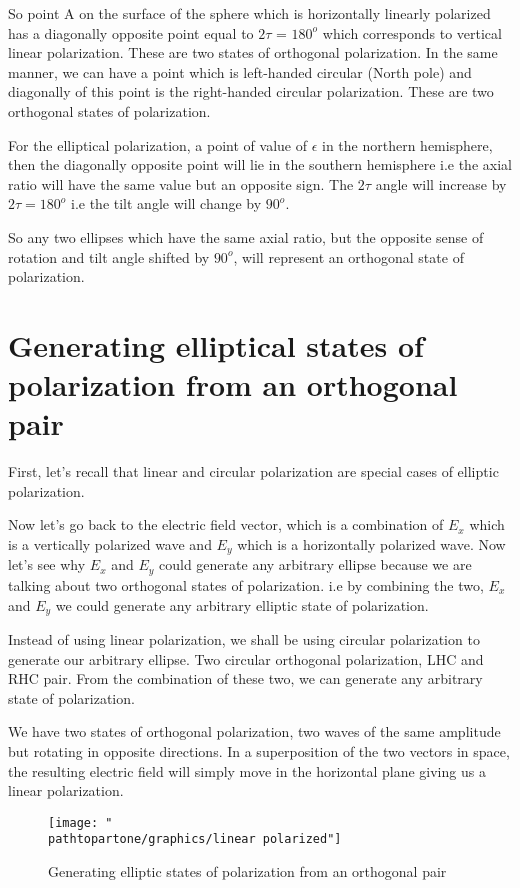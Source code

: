 So point A on the surface of the sphere which is horizontally linearly polarized has a diagonally opposite point equal to $2\tau$ = $180^{o}$ which corresponds to vertical linear polarization. These are two states of orthogonal polarization. In the same manner, we can have a point which is left-handed circular (North pole) and diagonally of this point is the right-handed circular polarization. These are two orthogonal states of polarization.

For the elliptical polarization, a point of value of $\epsilon$ in the northern hemisphere, then the diagonally opposite point will lie in the southern hemisphere i.e the axial ratio will have the same value but an opposite sign. The $2\tau$ angle will increase by $2\tau = 180^{o}$ i.e the tilt angle will change by $90^{o}$.

So any two ellipses which have the same axial ratio, but the opposite sense of rotation and tilt angle shifted by $90^{o}$, will represent an orthogonal state of polarization.

\section{Generating elliptical states of polarization from an orthogonal pair}
First, let's recall that linear and circular polarization are special cases of elliptic polarization. 

Now let's go back to the electric field vector, which is a combination of $E_{x}$ which is a vertically polarized wave and $E_{y}$ which is a horizontally polarized wave. Now let's see why $E_{x}$ and $E_{y}$ could generate any arbitrary ellipse because we are talking about two orthogonal states of polarization. i.e by combining the two, $E_{x}$ and $E_{y}$ we could generate any arbitrary elliptic state of polarization.

Instead of using linear polarization, we shall be using circular polarization to generate our arbitrary ellipse. Two circular orthogonal polarization, LHC and RHC pair. From the combination of these two, we can generate any arbitrary state of polarization. 

We have two states of orthogonal polarization, two waves of the same amplitude but rotating in opposite directions. In a superposition of the two vectors in space, the resulting electric field will simply move in the horizontal plane giving us a linear polarization.
\begin{figure}[h]
\centering
\texttt{[image: "\\pathtopartone/graphics/linear polarized"]}
\caption{Generating elliptic states of polarization from an orthogonal pair}
\label{fig:linear-polarized}
\end{figure}

